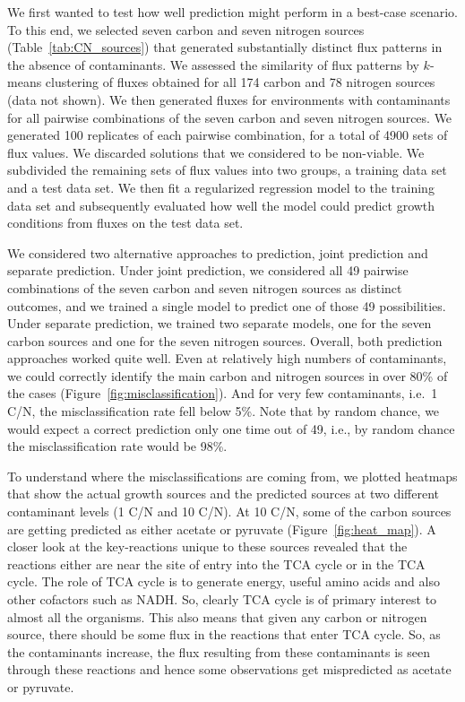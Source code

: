 \documentclass[12pt]{article}
\begin{document}
We first wanted to test how well prediction might perform in a best-case scenario. To this end, we selected seven carbon and seven nitrogen sources (Table~\ref{tab:CN_sources}) that generated substantially distinct flux patterns in the absence of contaminants. We assessed the similarity of flux patterns by $k$-means clustering of fluxes obtained for all 174 carbon and 78 nitrogen sources (data not shown). We then generated fluxes for environments with contaminants for all pairwise combinations of the seven carbon and seven nitrogen sources. We generated 100 replicates of each pairwise combination, for a total of 4900 sets of flux values. We discarded solutions that we considered to be non-viable. We subdivided the remaining sets of flux values into two groups, a training data set and a test data set. We then fit a regularized regression model to the training data set and subsequently evaluated how well the model could predict growth conditions from fluxes on the test data set.

We considered two alternative approaches to prediction, joint prediction and separate prediction. Under joint prediction, we considered all 49 pairwise combinations of the seven carbon and seven nitrogen sources as distinct outcomes, and we trained a single model to predict one of those 49 possibilities. Under separate prediction, we trained two separate models, one for the seven carbon sources and one for the seven nitrogen sources. Overall, both prediction approaches worked quite well.  Even at relatively high numbers of contaminants, we could correctly identify the main carbon and nitrogen sources in over 80\% of the cases (Figure~\ref{fig:misclassification}).  And for very few contaminants, i.e.\ 1 C/N, the misclassification rate fell below 5\%. Note that by random chance, we would expect a correct prediction only one time out of 49, i.e., by random chance the misclassification rate would be 98\%.

To understand where the misclassifications are coming from, we plotted heatmaps that show the actual growth sources and the predicted sources at two different contaminant levels (1 C/N and 10 C/N). At 10 C/N, some of the carbon sources are getting predicted as either acetate or pyruvate (Figure~\ref{fig:heat_map}). A closer look at the key-reactions unique to these sources revealed that the reactions either are near the site of entry into the TCA cycle or in the TCA cycle. The role of TCA cycle is to generate energy, useful amino acids and also other cofactors such as NADH. So, clearly TCA cycle is of primary interest to almost all the organisms. This also means that given any carbon or nitrogen source, there should be some flux in the reactions that enter TCA cycle. So, as the contaminants increase, the flux resulting from these contaminants is seen through these reactions and hence some observations get mispredicted as acetate or pyruvate. 
\end{document}
